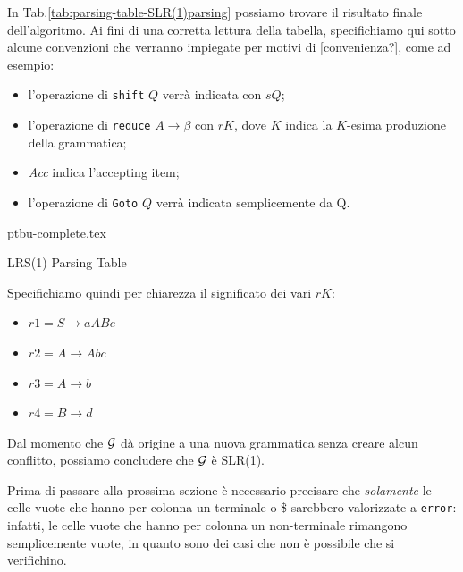 \documentclass[class=book, crop=false, oneside, 12pt]{standalone}
\begin{document}
In Tab.\ref{tab:parsing-table-SLR(1)parsing} possiamo trovare il risultato finale dell'algoritmo. Ai fini di una corretta lettura della tabella, specifichiamo qui sotto alcune convenzioni che verranno impiegate per motivi di [convenienza?], come ad esempio:
\begin{itemize}
    \item l'operazione di \texttt{shift} \(Q\) verrà indicata con \(sQ\);
    \item l'operazione di \texttt{reduce} \(A \rightarrow \beta\) con \(rK\), dove \(K\) indica la \(K\)-esima produzione della grammatica;
    \item \emph{Acc} indica l'accepting item;
    \item l'operazione di \texttt{Goto} \(Q\) verrà indicata semplicemente da Q.
\end{itemize}
\begin{table}[H]
    \centering
    {ptbu-complete.tex}
    \caption{LRS(1) Parsing Table}
    \label{tab:parsing-table-SLR(1)parsing}
\end{table}
Specifichiamo quindi per chiarezza il significato dei vari \(rK\):
\begin{itemize}
    \item \(r1 = S \to aABe\)
    \item \(r2 = A \to Abc\)
    \item \(r3 = A \to b\)
    \item \(r4 = B \to d\)
\end{itemize}

Dal momento che \(\mathcal{G}\) dà origine a una nuova grammatica senza creare alcun conflitto, possiamo concludere che \(\mathcal{G}\) è SLR(1).

Prima di passare alla prossima sezione è necessario precisare che \emph{solamente} le celle vuote che hanno per colonna un terminale o \$ sarebbero valorizzate a \texttt{error}: infatti, le celle vuote che hanno per colonna un non-terminale rimangono semplicemente vuote, in quanto sono dei casi che non è possibile che si verifichino. 
\end{document}
